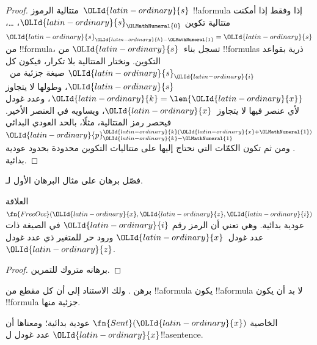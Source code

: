\documentclass[../../../include/open-logic-section]{subfiles}
\begin{document}
\begin{proof}
متتالية الرموز~${\OLId{latin-ordinary}{s}}$ !!a{formula} إذا وفقط إذا
أمكنت متتالية تكوين ${\OLId{latin-ordinary}{s}}_{\OLMathNumeral{0}}$، \dots،
${\OLId{latin-ordinary}{s}}_{{\OLId{latin-ordinary}{k}}-{\OLMathNumeral{1}}}={\OLId{latin-ordinary}{s}}$ من !!{formula}، تسجل
بناء~${\OLId{latin-ordinary}{s}}$ من !!{formula}s ذرية بقواعد
التكوين. ونختار المتتالية بلا تكرار،
فيكون كل ${\OLId{latin-ordinary}{s}}_{\OLId{latin-ordinary}{i}}$ صيغة جزئية من~${\OLId{latin-ordinary}{s}}$،
وطولها لا يتجاوز ${\OLId{latin-ordinary}{k}}=\len{{\OLId{latin-ordinary}{x}}}$،
وعدد غودل لأي عنصر فيها لا يتجاوز~${\OLId{latin-ordinary}{x}}$،
ويساويه في العنصر الأخير. فيحصر رمز
المتتالية، مثلًا، بالحد العودي البدائي
${\OLId{latin-ordinary}{p}}_{{\OLId{latin-ordinary}{k}}-{\OLMathNumeral{1}}}^{{\OLId{latin-ordinary}{k}}({\OLId{latin-ordinary}{x}}+{\OLMathNumeral{1}})}$. ومن ثم تكون
الكمّات التي نحتاج إليها على متتاليات
التكوين محدودة بحدود عودية بدائية.
\end{proof}

\begin{prob}
فصّل برهان  على مثال
البرهان الأول لـ.
\end{prob}

\begin{prop}
العلاقة $\fn{FreeOcc}({\OLId{latin-ordinary}{x}},{\OLId{latin-ordinary}{z}},{\OLId{latin-ordinary}{i}})$ عودية بدائية. وهي تعني
أن الرمز رقم ${\OLId{latin-ordinary}{i}}$ في الصيغة ذات عدد غودل~${\OLId{latin-ordinary}{x}}$
ورود حر للمتغير ذي عدد غودل~${\OLId{latin-ordinary}{z}}$.
\end{prop}

\begin{proof}
برهانه متروك للتمرين.
\end{proof}

\begin{prob}
برهن . ولك الاستناد إلى أن كل مقطع من !!a{formula} يكون !!a{formula} لا بد أن يكون
!!{formula} جزئية منها.
\end{prob}

\begin{prop}
الخاصية $\fn{Sent}({\OLId{latin-ordinary}{x}})$ عودية بدائية؛ ومعناها أن ${\OLId{latin-ordinary}{x}}$
عدد غودل ل!!a{sentence}.
\end{prop}
\end{document}
